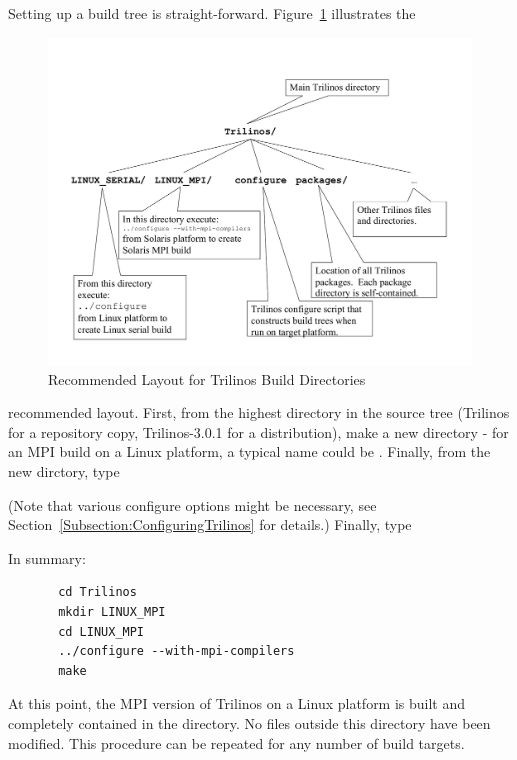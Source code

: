 \documentclass[12pt,strict]{TrilinosDevGuide}
\begin{document}
Setting up a build tree is straight-forward.
Figure~\ref{Figure:TrilinosDirectoryStructure} illustrates the
\begin{figure}
\begin{center}
\includegraphics[width=6in]{TrilinosDirectoryStructure}
\end{center}
\label{Figure:TrilinosDirectoryStructure}
\caption{Recommended Layout for Trilinos Build Directories}
\end{figure}recommended layout.  First, from the highest 
directory in the source tree (Trilinos for a repository copy, Trilinos-3.0.1 
for a distribution), make a new directory - for an MPI build
on a Linux platform, a 
typical name could be .  
Finally, from the new dirctory, type


(Note that various configure options might be necessary, see Section~\ref{Subsection:ConfiguringTrilinos} for details.)  Finally, type



In summary:

\begin{verbatim}
       cd Trilinos
       mkdir LINUX_MPI
       cd LINUX_MPI
       ../configure --with-mpi-compilers
       make
\end{verbatim}
At this point, the MPI version of Trilinos on a Linux platform is
built and completely contained in the 
directory.  No files outside this directory have been modified.  This
procedure can be repeated for any number of build targets.
\end{document}
